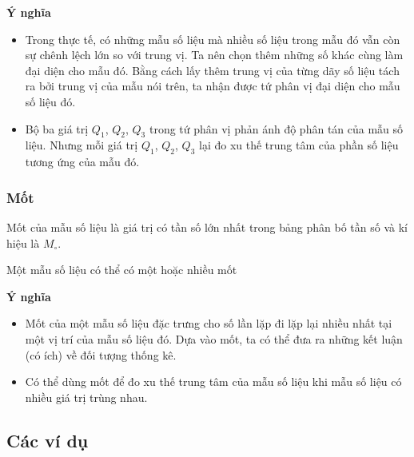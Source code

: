 \textbf{Ý nghĩa}
\begin{itemize}
    \item Trong thực tế, có những mẫu số liệu mà nhiều số liệu trong mẫu đó vẫn còn sự chênh lệch lớn so với trung vị. Ta nên chọn thêm những số khác cùng làm đại diện cho mẫu đó. Bằng cách lấy thêm trung vị của từng dãy số liệu tách ra bởi trung vị của mẫu nói trên, ta nhận được tứ phân vị đại diện cho mẫu số liệu đó.
    \item Bộ ba giá trị $Q_1$, $Q_2$, $Q_3$ trong tứ phân vị phản ánh độ phân tán của mẫu số liệu. Nhưng mỗi giá trị $Q_1$, $Q_2$, $Q_3$ lại đo xu thế trung tâm của phần số liệu tương ứng của mẫu đó.
\end{itemize}

\subsubsection{Mốt}
    Mốt của mẫu số liệu là giá trị có tần số lớn nhất trong bảng phân bố tần số và kí hiệu là $M_\circ$.
\begin{note}
	Một mẫu số liệu có thể có một hoặc nhiều mốt
\end{note}
\textbf{Ý nghĩa}
\begin{itemize}
    \item Mốt của một mẫu số liệu đặc trưng cho số lần lặp đi lặp lại nhiều nhất tại một vị trí của mẫu số liệu đó. Dựa vào mốt, ta có thể đưa ra những kết luận (có ích) về đối tượng thống kê.
    \item Có thể dùng mốt để đo xu thế trung tâm của mẫu số liệu khi mẫu số liệu có nhiều giá trị trùng nhau.
\end{itemize}

\setcounter{subsection}{1}
\subsection{Các ví dụ}
\setcounter{subsubsection}{0}
